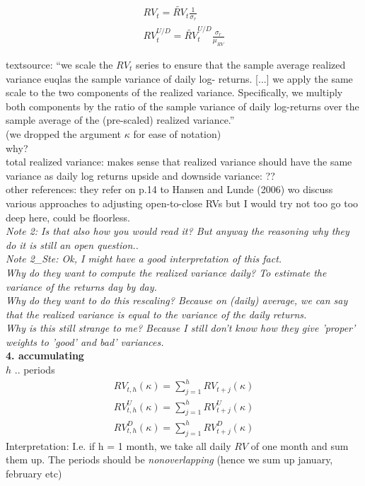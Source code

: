 \documentclass{article}
\begin{document}
\begin{align*}
RV_{t} = \tilde{RV}_{t} \frac{1}{\sigma_{r}}\\
RV_{t}^{U/D} = \tilde{RV}_{t}^{U/D}  \frac{\sigma_{r}}{\mu_{RV}}
\end{align*}

textsource: 
``we scale the $RV_{t}$ series to ensure that the sample average realized variance euqlas the sample variance of daily log- returns. [...] we apply the same scale to the two components of the realized variance. Specifically, we multiply both components by the ratio of the sample variance of daily log-returns over the sample average of the (pre-scaled) realized variance.''\\ (we dropped the argument $\kappa$ for ease of notation)\\

why?\\
total realized variance: makes sense that realized variance should have the same variance as daily log returns
upside and downside variance: ??\\

other references: they refer on p.14 to Hansen and Lunde (2006) wo discuss various approaches to adjusting open-to-close RVs but I would try not too go too deep here, could be floorless.\\

\textit{Note 2: Is that also how you would read it? But anyway the reasoning why they do it is still an open question..}\\

\textit{Note 2\_Ste: Ok, I might have a good interpretation of this fact.\\
Why do they want to compute the realized variance daily? To estimate the variance of the returns day by day.\\
Why do they want to do this rescaling? Because on (daily) average, we can say that the realized variance is equal to the variance of the daily returns.\\
Why is this still strange to me? Because I still don't know how they give 'proper' weights to 'good' and bad' variances.}\\

\textbf{4. accumulating}\\

$h$ .. periods
\begin{align*}
RV_{t,h}(\kappa) = \sum_{j=1}^{h} RV_{t+j}(\kappa)\\
RV_{t,h}^{U}(\kappa) = \sum_{j=1}^{h} RV_{t+j}^{U}(\kappa)\\
RV_{t,h}^{D}(\kappa) = \sum_{j=1}^{h} RV_{t+j}^{D}(\kappa)
\end{align*}
Interpretation: I.e. if h = 1 month, we take all daily $RV$ of one month and sum them up. The periods should be \textit{nonoverlapping} (hence we sum up january, february etc)\\
\end{document}
